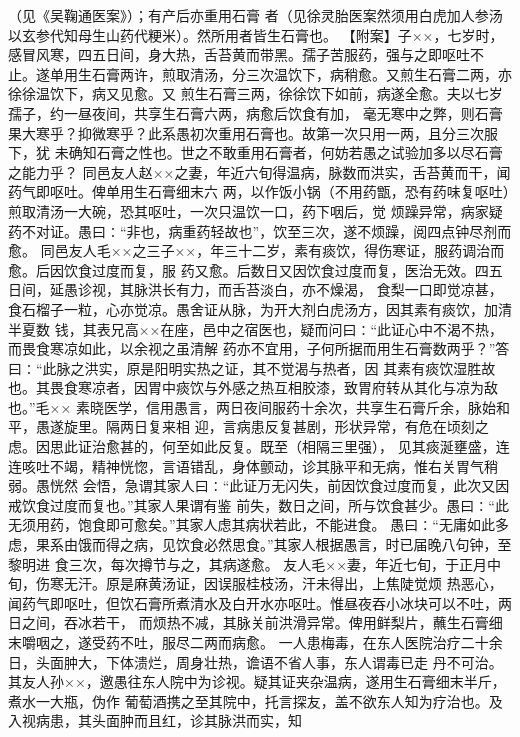 \documentclass[a4paper,12pt,UTF8,twoside]{ctexbook}
\begin{document}
（见《吴鞠通医案》）；有产后亦重用石膏 
者（见徐灵胎医案然须用白虎加人参汤以玄参代知母生山药代粳米）。然所用者皆生石膏也。 
【附案】子××，七岁时，感冒风寒，四五日间，身大热，舌苔黄而带黑。孺子苦服药，强与之即呕吐不 
止。遂单用生石膏两许，煎取清汤，分三次温饮下，病稍愈。又煎生石膏二两，亦徐徐温饮下，病又见愈。又 
煎生石膏三两，徐徐饮下如前，病遂全愈。夫以七岁孺子，约一昼夜间，共享生石膏六两，病愈后饮食有加， 
毫无寒中之弊，则石膏果大寒乎？抑微寒乎？此系愚初次重用石膏也。故第一次只用一两，且分三次服下，犹 
未确知石膏之性也。世之不敢重用石膏者，何妨若愚之试验加多以尽石膏之能力乎？ 
同邑友人赵××之妻，年近六旬得温病，脉数而洪实，舌苔黄而干，闻药气即呕吐。俾单用生石膏细末六 
两，以作饭小锅（不用药甑，恐有药味复呕吐）煎取清汤一大碗，恐其呕吐，一次只温饮一口，药下咽后，觉 
烦躁异常，病家疑药不对证。愚曰∶“非也，病重药轻故也”，饮至三次，遂不烦躁，阅四点钟尽剂而愈。 
同邑友人毛××之三子××，年三十二岁，素有痰饮，得伤寒证，服药调治而愈。后因饮食过度而复，服 
药又愈。后数日又因饮食过度而复，医治无效。四五日间，延愚诊视，其脉洪长有力，而舌苔淡白，亦不燥渴， 
食梨一口即觉凉甚，食石榴子一粒，心亦觉凉。愚舍证从脉，为开大剂白虎汤方，因其素有痰饮，加清半夏数 
钱，其表兄高××在座，邑中之宿医也，疑而问曰∶“此证心中不渴不热，而畏食寒凉如此，以余视之虽清解 
药亦不宜用，子何所据而用生石膏数两乎？”答曰∶“此脉之洪实，原是阳明实热之证，其不觉渴与热者，因 
其素有痰饮湿胜故也。其畏食寒凉者，因胃中痰饮与外感之热互相胶漆，致胃府转从其化与凉为敌也。”毛×× 
素晓医学，信用愚言，两日夜间服药十余次，共享生石膏斤余，脉始和平，愚遂旋里。隔两日复来相 
迎，言病患反复甚剧，形状异常，有危在顷刻之虑。因思此证治愈甚的，何至如此反复。既至（相隔三里强）， 
见其痰涎壅盛，连连咳吐不竭，精神恍惚，言语错乱，身体颤动，诊其脉平和无病，惟右关胃气稍弱。愚恍然 
会悟，急谓其家人曰∶“此证万无闪失，前因饮食过度而复，此次又因戒饮食过度而复也。”其家人果谓有鉴 
前失，数日之间，所与饮食甚少。愚曰∶“此无须用药，饱食即可愈矣。”其家人虑其病状若此，不能进食。 
愚曰∶“无庸如此多虑，果系由饿而得之病，见饮食必然思食。”其家人根据愚言，时已届晚八句钟，至黎明进 
食三次，每次撙节与之，其病遂愈。 
友人毛××妻，年近七旬，于正月中旬，伤寒无汗。原是麻黄汤证，因误服桂枝汤，汗未得出，上焦陡觉烦 
热恶心，闻药气即呕吐，但饮石膏所煮清水及白开水亦呕吐。惟昼夜吞小冰块可以不吐，两日之间，吞冰若干， 
而烦热不减，其脉关前洪滑异常。俾用鲜梨片，蘸生石膏细末嚼咽之，遂受药不吐，服尽二两而病愈。 
一人患梅毒，在东人医院治疗二十余日，头面肿大，下体溃烂，周身壮热，谵语不省人事，东人谓毒已走 
丹不可治。其友人孙××，邀愚往东人院中为诊视。疑其证夹杂温病，遂用生石膏细末半斤，煮水一大瓶，伪作 
葡萄酒携之至其院中，托言探友，盖不欲东人知为疗治也。及入视病患，其头面肿而且红，诊其脉洪而实，知 
\end{document}
